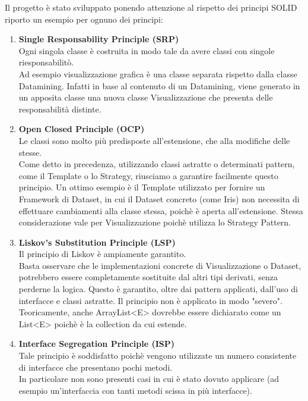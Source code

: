 \documentclass[a4paper, oneside]{book}
\begin{document}
Il progetto è stato sviluppato ponendo attenzione al rispetto dei principi SOLID riporto un esempio per ognuno dei principi:
    \begin{enumerate}
      
         \item \textbf{Single Responsability Principle (SRP) }\\
         Ogni singola classe è costruita in modo tale da avere classi con singole riesponsabilitò.\\
         Ad esempio visualizzazione grafica è una classe separata rispetto dalla classe Datamining. Infatti in base al contenuto di un Datamining, viene generato in un apposita classe una nuova classe Visualizzazione che presenta delle responsabilità distinte. 
        \item \textbf{Open Closed Principle (OCP)}\\
         Le classi sono molto più predisposte all'estensione, che alla modifiche delle stesse.\\ Come detto in precedenza, utilizzando classi astratte o determinati pattern, come il Template o lo Strategy, riusciamo a garantire facilmente questo principio. Un ottimo esempio è il Template utilizzato per fornire un Framework di Dataset, in cui il Dataset concreto (come Iris) non necessita di effettuare cambiamenti alla classe stessa, poichè è aperta all'estensione. Stessa considerazione vale per Visualizzazione poichè utilizza lo Strategy Pattern.
        \item \textbf{Liskov's Substitution Principle (LSP)}\\
        Il principio di Liskov è ampiamente garantito. \\Basta osservare che le implementazioni concrete di Visualizzazione o Dataset, potrebbero essere completamente sostituite dal altri tipi derivati, senza perderne la logica. Questo è garantito, oltre dai pattern applicati, dall'uso di interfacce e classi astratte. Il principio non è applicato in modo "severo". Teoricamente, anche ArrayList<E> dovrebbe essere dichiarato come un List<E> poichè è la collection da cui estende.

        \item \textbf{Interface Segregation Principle (ISP)}\\
        Tale principio è soddisfatto poichè vengono utilizzate un numero consistente di interfacce che presentano pochi metodi.\\ In particolare non sono presenti casi in cui è stato dovuto applicare (ad esempio un'interfaccia con tanti metodi scissa in più interfacce).
        

\end{enumerate}
\end{document}
